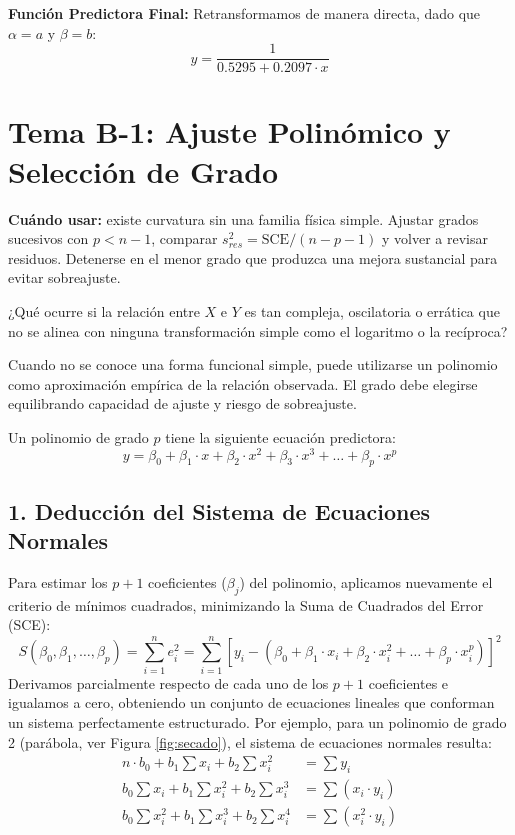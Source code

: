 \documentclass[11pt,a4paper]{article}
\begin{document}
    \textbf{Función Predictora Final:}
    Retransformamos de manera directa, dado que $\alpha = a$ y $\beta = b$:
    \[ y = \frac{1}{0.5295 + 0.2097 \cdot x} \]
 

\clearpage
\section{Tema B-1: Ajuste Polinómico y Selección de Grado}

\begin{ruta}
\textbf{Cuándo usar:} existe curvatura sin una familia física simple. Ajustar grados sucesivos con $p<n-1$, comparar $s^2_{res}=\mathrm{SCE}/(n-p-1)$ y volver a revisar residuos. Detenerse en el menor grado que produzca una mejora sustancial para evitar sobreajuste.
\end{ruta}

¿Qué ocurre si la relación entre $X$ e $Y$ es tan compleja, oscilatoria o errática que no se alinea con ninguna transformación simple como el logaritmo o la recíproca?

Cuando no se conoce una forma funcional simple, puede utilizarse un polinomio como aproximación empírica de la relación observada. El grado debe elegirse equilibrando capacidad de ajuste y riesgo de sobreajuste.

Un polinomio de grado $p$ tiene la siguiente ecuación predictora:
\begin{equation}
    y = \beta_0 + \beta_1 \cdot x + \beta_2 \cdot x^2 + \beta_3 \cdot x^3 + \dots + \beta_p \cdot x^p
\end{equation}

\subsection{1. Deducción del Sistema de Ecuaciones Normales}
    Para estimar los $p+1$ coeficientes ($\beta_j$) del polinomio, aplicamos nuevamente el criterio de mínimos cuadrados, minimizando la Suma de Cuadrados del Error (SCE):
    \[ S(\beta_0, \beta_1, \dots, \beta_p) = \sum_{i=1}^n e_i^2 = \sum_{i=1}^n \left[ y_i - (\beta_0 + \beta_1 \cdot x_i + \beta_2 \cdot x_i^2 + \dots + \beta_p \cdot x_i^p) \right]^2 \]
    Derivamos parcialmente respecto de cada uno de los $p+1$ coeficientes e igualamos a cero, obteniendo un conjunto de ecuaciones lineales que conforman un sistema perfectamente estructurado. Por ejemplo, para un polinomio de grado 2 (parábola, ver Figura \ref{fig:secado}), el sistema de ecuaciones normales resulta:
    \begin{align*}
        n \cdot b_0 + b_1 \sum x_i + b_2 \sum x_i^2 &= \sum y_i \\
        b_0 \sum x_i + b_1 \sum x_i^2 + b_2 \sum x_i^3 &= \sum (x_i \cdot y_i) \\
        b_0 \sum x_i^2 + b_1 \sum x_i^3 + b_2 \sum x_i^4 &= \sum (x_i^2 \cdot y_i)
    \end{align*}
\end{document}
